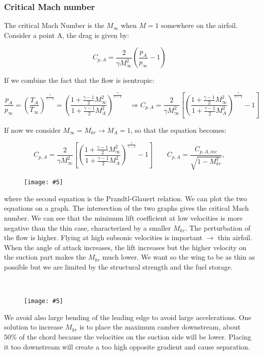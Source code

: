 \documentclass[british,french,11pt, a4paper, openany]{article}
\newcommand{\wrapfig}[6]{%
	\begin{figure}%
		\vspace{-5mm}%
		\texttt{[image: \#5]}%
		\captionof{figure}{}%
		\label{#6}%
	\end{figure}%
}
\begin{document}
\subsubsection{Critical Mach number}
The critical Mach Number is the $M_\infty$ when $M = 1$ somewhere on the airfoil. Consider a point A, the drag is given by: 

\begin{equation}
C_{p,A} = \frac{2}{\gamma M_\infty^2} \left( \frac{p_A}{p_\infty} -1 \right)
\end{equation}

If we combine the fact that the flow is isentropic:

\begin{equation}
\frac{p_A}{p_\infty} = \left(\frac{T_A}{T_\infty}\right)^{\frac{\gamma}{\gamma -1}} = \left(\frac{1+\frac{\gamma - 1}{2}M^2_\infty}{1+\frac{\gamma - 1}{2}M^2_A}\right)^{\frac{\gamma}{\gamma -1}} 
\quad \Rightarrow C_{p,A} = \frac{2}{\gamma M_\infty^2} \left[ \left(\frac{1+\frac{\gamma - 1}{2}M^2_\infty}{1+\frac{\gamma - 1}{2}M^2_A}\right)^{\frac{\gamma}{\gamma -1}} -1 \right]
\end{equation}

If now we consider $M_\infty = M_{kr} \rightarrow M_A = 1$, so that the equation becomes: 

\begin{equation}
C_{p,A} = \frac{2}{\gamma M_\infty^2} \left[ \left(\frac{1+\frac{\gamma - 1}{2}M^2_\infty}{1+\frac{\gamma - 1}{2}M^2_A}\right)^{\frac{\gamma}{\gamma -1}} -1 \right] \qquad C_{p,A} = \frac{C_{p,A,inc}}{\sqrt{1-M_{kr}^2}},
\end{equation}


\wrapfig{10}{r}{5}{0.15}{ch6/13}{fig:6.13}
where the second equation is the Prandtl-Glauert relation. 
We can plot the two equations on a graph. The intersection of the two graphs gives the critical Mach number. We can see that the minimum lift coefficient at low velocities is more negative than the thin case, characterized by a smaller $M_{kr}$. The perturbation of the flow is higher. Flying at high subsonic velocities is important $\rightarrow$ thin airfoil. When the angle of attack increases, the lift increases but the higher velocity on the suction part makes the $M_{kr}$ much lower. We want so the wing to be as thin as possible but we are limited by the structural strength and the fuel storage.

\ \\
\wrapfig{10}{l}{4.5}{0.1}{ch6/14}{fig:6.14}
We avoid also large bending of the leading edge to avoid large accelerations. One solution to increase $M_{kr}$ is to place the maximum camber downstream, about 50\% of the chord because the velocities on the suction side will be lower. Placing it too downstream will create a too high opposite gradient and cause separation. 
\end{document}
